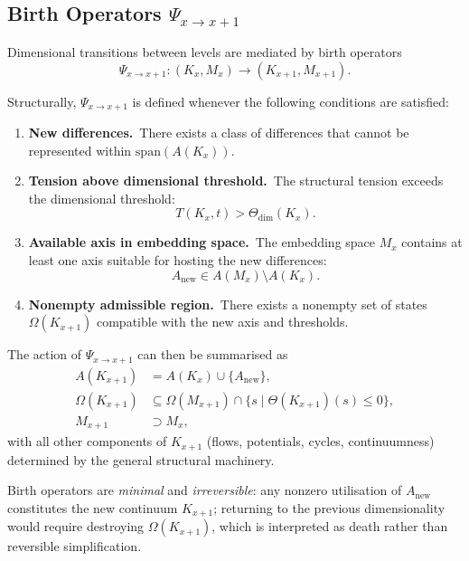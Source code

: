 \subsection{Birth Operators \texorpdfstring{$\Psi_{x\to x+1}$}{Psi\_x→x+1}}
\label{sec:birth-operators}

Dimensional transitions between levels are mediated by birth operators
\[
  \Psi_{x\to x+1} : (K_x, M_x) \longrightarrow (K_{x+1}, M_{x+1}).
\]

Structurally, \(\Psi_{x\to x+1}\) is defined whenever the following conditions
are satisfied:
\begin{enumerate}
  \item \textbf{New differences.}\ 
        There exists a class of differences that cannot be represented within
        \(\mathrm{span}(A(K_x))\).
  \item \textbf{Tension above dimensional threshold.}\ 
        The structural tension exceeds the dimensional threshold:
        \[
          T(K_x,t) > \Theta_{\mathrm{dim}}(K_x).
        \]
  \item \textbf{Available axis in embedding space.}\ 
        The embedding space \(M_x\) contains at least one axis suitable for
        hosting the new differences:
        \[
          A_{\mathrm{new}} \in A(M_x) \setminus A(K_x).
        \]
  \item \textbf{Nonempty admissible region.}\ 
        There exists a nonempty set of states \(\Omega(K_{x+1})\) compatible
        with the new axis and thresholds.
\end{enumerate}

The action of \(\Psi_{x\to x+1}\) can then be summarised as
\begin{align*}
  A(K_{x+1})      &= A(K_x) \cup \{A_{\mathrm{new}}\}, \\
  \Omega(K_{x+1}) &\subseteq
     \Omega(M_{x+1}) \cap
     \big\{ s \mid \Theta(K_{x+1})(s) \le 0 \big\}, \\
  M_{x+1}         &\supset M_x,
\end{align*}
with all other components of \(K_{x+1}\) (flows, potentials, cycles,
continuumness) determined by the general structural machinery.

Birth operators are \emph{minimal} and \emph{irreversible}:
any nonzero utilisation of \(A_{\mathrm{new}}\) constitutes the new continuum
\(K_{x+1}\); returning to the previous dimensionality would require destroying
\(\Omega(K_{x+1})\), which is interpreted as death rather than reversible
simplification.

